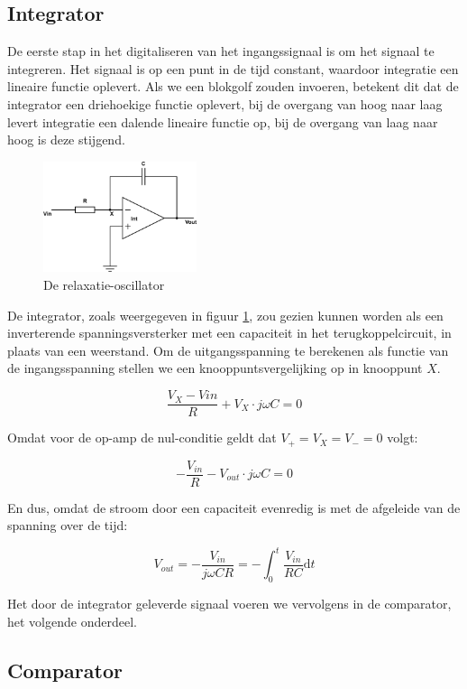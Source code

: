 \documentclass{report}
\begin{document}
\subsection{Integrator}

De eerste stap in het digitaliseren van het ingangssignaal is om het signaal te integreren. Het signaal is op een punt in de tijd constant, waardoor integratie een lineaire functie oplevert. Als we een blokgolf zouden invoeren, betekent dit dat de integrator een driehoekige functie oplevert, bij de overgang van hoog naar laag levert integratie een dalende lineaire functie op, bij de overgang van laag naar hoog is deze stijgend.\\

\begin{figure}
	\centering
	\includegraphics[width=0.4\textwidth]{integrator.png}
	\caption{De relaxatie-oscillator}
	\label{fig:int}
\end{figure}

De integrator, zoals weergegeven in figuur \ref{fig:int}, zou gezien kunnen worden als een inverterende spanningsversterker met een capaciteit in het terugkoppelcircuit, in plaats van een weerstand. Om de uitgangsspanning te berekenen als functie van de ingangsspanning stellen we een knooppuntsvergelijking op in knooppunt $X$.

$$\frac{V_{X} - V{in}}{R} + V_{X} \cdot j\omega C = 0$$

\noindent
Omdat voor de op-amp de nul-conditie geldt dat $V_{+} = V_{X} = V_{-} = 0$ volgt:

$$-\frac{V_{in}}{R} - V_{out} \cdot j\omega C = 0$$

\noindent
En dus, omdat de stroom door een capaciteit evenredig is met de afgeleide van de spanning over de tijd:

\begin{equation}
	V_{out} = -\frac{V_{in}}{j\omega CR} = -\int_0^t \frac{V_{in}}{RC} \mathrm{d}t
	\label{eq:integrator}
\end{equation}

\noindent
Het door de integrator geleverde signaal voeren we vervolgens in de comparator, het volgende onderdeel.

\subsection{Comparator}
\end{document}

